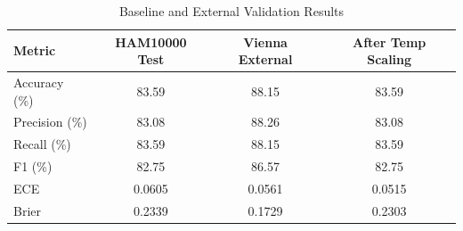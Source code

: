 \begin{table}[h]
\centering
\caption{Baseline and External Validation Results}
\begin{tabular}{lccc}
\toprule
Metric & HAM10000 Test & Vienna External & After Temp Scaling \\
\midrule
Accuracy (\%) & 83.59 & 88.15 & 83.59 \\
Precision (\%) & 83.08 & 88.26 & 83.08 \\
Recall (\%) & 83.59 & 88.15 & 83.59 \\
F1 (\%) & 82.75 & 86.57 & 82.75 \\
ECE & 0.0605 & 0.0561 & 0.0515 \\
Brier & 0.2339 & 0.1729 & 0.2303 \\
\bottomrule
\end{tabular}
\label{tab:main_results}
\end{table}
